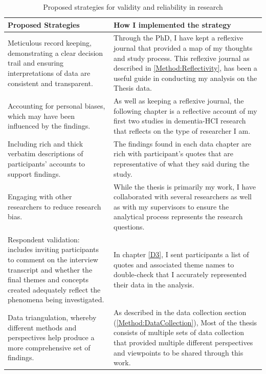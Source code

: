 \begin{center}
\begin{table}[htp]
\begin{tabular}{ | m{17em} | m{17em}|  } 
  \hline
  \textbf{Proposed Strategies} & \textbf{How I implemented the strategy}  \\ 
  \hline
   Meticulous record keeping, demonstrating a clear decision trail and ensuring interpretations of data are consistent and transparent.
  &  Through the PhD, I have kept a reflexive journal that provided a map of my thoughts and study process. This reflexive journal as described in \ref{Method:Reflectivity}, has been a useful guide in conducting my analysis on the Thesis data.
 \\ 
 \hline
 Accounting for personal biases, which may have been influenced by the findings. 
  & As well as keeping a reflexive journal, the following chapter is a reflective account of my first two studies in dementia-HCI research that reflects on the type of researcher I am. \\ 
  \hline
   Including rich and thick verbatim descriptions of participants’ accounts to support findings.
  & The findings found in each data chapter are rich with participant's quotes that are representative of what they said during the study.  \\ 
  \hline
   Engaging with other researchers to reduce research bias.
  & While the thesis is primarily my work, I have collaborated with several researchers as well as with my supervisors to ensure the analytical process represents the research questions.  \\ 
  \hline
   Respondent validation: includes inviting participants to comment on the interview transcript and whether the final themes and concepts created adequately reflect the phenomena being investigated.
  & In chapter \ref{D3}, I sent participants a list of quotes and associated theme names to double-check that I accurately represented their data in the analysis. \\ 
  \hline
   Data triangulation, whereby different methods and perspectives help produce a more comprehensive set of findings.
  & As described in the data collection section (\ref{Method:DataCollection}), Most of the thesis consists of multiple sets of data collection that provided multiple different perspectives and viewpoints to be shared through this work.  \\ 
  \hline
  
\end{tabular}
\caption{Proposed strategies for validity and reliability in research}
\label{tab:ProposedStrategies}
\end{table}
\end{center}

